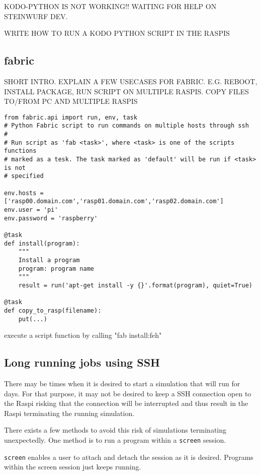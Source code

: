 KODO-PYTHON IS NOT WORKING!! WAITING FOR HELP ON STEINWURF DEV.

WRITE HOW TO RUN A KODO PYTHON SCRIPT IN THE RASPIS

\subsection{fabric}

SHORT INTRO. EXPLAIN A FEW USECASES FOR FABRIC. E.G. REBOOT, INSTALL PACKAGE, RUN SCRIPT ON MULTIPLE RASPIS. COPY FILES TO/FROM PC AND MULTIPLE RASPIS 


\begin{lstlisting}[]
from fabric.api import run, env, task
# Python Fabric script to run commands on multiple hosts through ssh
#
# Run script as 'fab <task>', where <task> is one of the scripts functions
# marked as a tesk. The task marked as 'default' will be run if <task> is not
# specified

env.hosts = ['rasp00.domain.com','rasp01.domain.com','rasp02.domain.com']
env.user = 'pi'
env.password = 'raspberry'

@task
def install(program):
    """
    Install a program
    program: program name
    """
    result = run('apt-get install -y {}'.format(program), quiet=True)

@task
def copy_to_rasp(filename):
    put(...)

\end{lstlisting}
\FloatBarrier

execute a script function by calling "fab install:feh"




\subsection{Long running jobs using SSH}

There may be times when it is desired to start a simulation that will
run for days. For that purpose, it may not be desired to keep
a \ac{SSH} connection open to the \ac{Raspi} risking that the connection
will be interrupted and thus result in the \ac{Raspi} terminating
the running simulation.

There exists a few methods to avoid this risk of simulations terminating
unexpectedly. One method is to run a program within a \texttt{screen} session.

\texttt{screen} enables a user to attach and detach the session as it is
desired. Programs within the screen session just keeps running.

